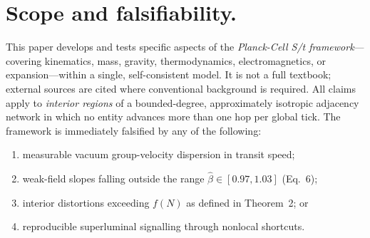 \section*{Scope and falsifiability.}
This paper develops and tests specific aspects of the \emph{Planck-Cell S/t framework}---covering kinematics, mass, gravity, thermodynamics, electromagnetics, or expansion---within a single, self-consistent model. It is not a full textbook; external sources are cited where conventional background is required. All claims apply to \emph{interior regions} of a bounded-degree, approximately isotropic adjacency network in which no entity advances more than one hop per global tick. The framework is immediately falsified by any of the following:
\begin{enumerate}[label=(\roman*)]
  \item measurable vacuum group-velocity dispersion in transit speed;
  \item weak-field slopes falling outside the range $\hat\beta \in [0.97,1.03]$ (Eq.~6);
  \item interior distortions exceeding $f(N)$ as defined in Theorem~2; or
  \item reproducible superluminal signalling through nonlocal shortcuts.
\end{enumerate}
